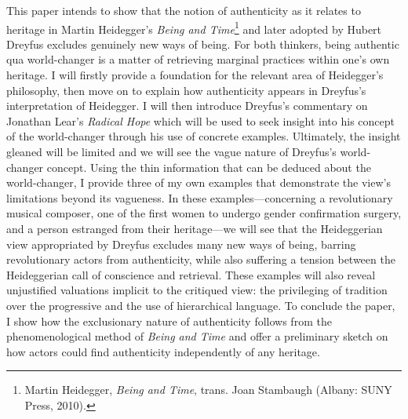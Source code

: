 

This paper intends to show that the notion of authenticity as it relates
to heritage in Martin Heidegger's \emph{Being and Time}\footnote{Martin
  Heidegger, \emph{Being and Time}, trans. Joan Stambaugh (Albany: SUNY
  Press, 2010).} and later adopted by Hubert Dreyfus excludes genuinely
new ways of being. For both thinkers, being authentic qua world-changer
is a matter of retrieving marginal practices within one's own heritage.
I will firstly provide a foundation for the relevant area of Heidegger's
philosophy, then move on to explain how authenticity appears in
Dreyfus's interpretation of Heidegger. I will then introduce Dreyfus's
commentary on Jonathan Lear's \emph{Radical Hope} which will be used to
seek insight into his concept of the world-changer through his use of
concrete examples. Ultimately, the insight gleaned will be limited and
we will see the vague nature of Dreyfus's world-changer concept. Using
the thin information that can be deduced about the world-changer, I
provide three of my own examples that demonstrate the view's limitations
beyond its vagueness. In these examples---concerning a revolutionary
musical composer, one of the first women to undergo gender confirmation
surgery, and a person estranged from their heritage---we will see that
the Heideggerian view appropriated by Dreyfus excludes many new ways of
being, barring revolutionary actors from authenticity, while also
suffering a tension between the Heideggerian call of conscience and
retrieval. These examples will also reveal unjustified valuations
implicit to the critiqued view: the privileging of tradition over the
progressive and the use of hierarchical language. To conclude the paper,
I show how the exclusionary nature of authenticity follows from the
phenomenological method of \emph{Being and Time} and offer a preliminary
sketch on how actors could find authenticity independently of any
heritage.

